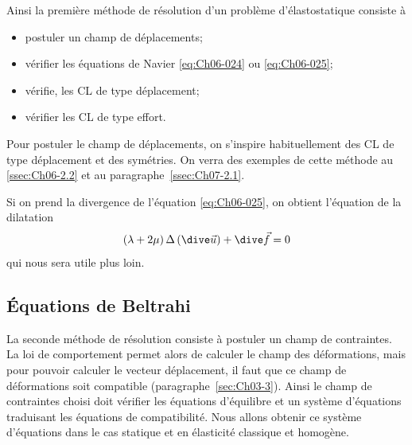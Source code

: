 Ainsi la première méthode de résolution d'un problème d'élastostatique consiste à 
\begin{itemize}
    \item postuler un champ de déplacements;
    \item vérifier les équations de Navier \eqref{eq:Ch06-024} ou \eqref{eq:Ch06-025};
    \item vérifie, les CL de type déplacement;
    \item vérifier les CL de type effort.
\end{itemize}
Pour postuler le champ de déplacements, on s'inspire habituellement des CL de type déplacement et des symétries.
On verra des exemples de cette méthode au \ref{ssec:Ch06-2.2} et au paragraphe~\ref{ssec:Ch07-2.1}. 

Si on prend la divergence de l'équation \eqref{eq:Ch06-025}, on obtient l'équation de la dilatation
\begin{equation}
    \left( \lambda + 2 \mu \right) \Delta \left( \dive \vec{u} \right) + \dive \vec{f} = 0
    \label{eq:Ch06-026}
\end{equation}
qui nous sera utile plus loin.

\subsection{Équations de Beltrahi} \label{ssec:Ch06-1.4}
La seconde méthode de résolution consiste à postuler un champ de contraintes.
La loi de comportement permet alors de calculer le champ des déformations, mais pour pouvoir calculer le vecteur déplacement, il faut que ce champ de déformations soit compatible (paragraphe~\ref{sec:Ch03-3}).
Ainsi le champ de contraintes choisi doit vérifier les équations d'équilibre et un système d'équations traduisant les équations de compatibilité.
Nous allons obtenir ce système d'équations dans le cas statique et en élasticité classique et homogène.

